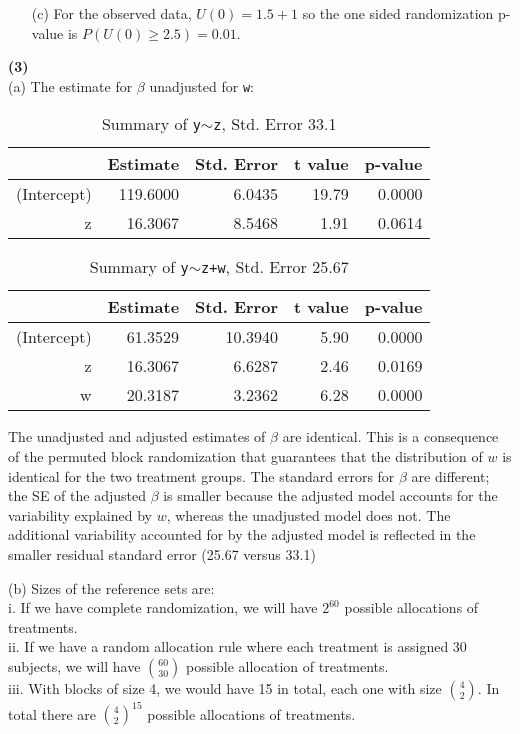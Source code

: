 \documentclass[11pt,a4paper]{article}
\begin{document}
\begin{enumerate}
\item[(c)] For the observed data, $U(0)=1.5+1$ so the one sided randomization p-value is $P(U(0)\geq 2.5)=0.01$.
\end{enumerate}

\noindent
\textbf{(3)} \\
\noindent
(a) The estimate for $\beta$ unadjusted for \texttt{w}:
\begin{table}[H]
\centering
\begin{tabular}{rrrrr}
  \hline
 & Estimate & Std. Error & t value & p-value \\ 
  \hline
(Intercept) & 119.6000 & 6.0435 & 19.79 & 0.0000 \\ 
  z & 16.3067 & 8.5468 & 1.91 & 0.0614 \\ 
   \hline
\end{tabular}
\caption{Summary of \texttt{y}$\sim$\texttt{z}, Std. Error 33.1}
\end{table}

\begin{table}[ht]
\centering
\begin{tabular}{rrrrr}
  \hline
 & Estimate & Std. Error & t value & p-value \\ 
  \hline
(Intercept) & 61.3529 & 10.3940 & 5.90 & 0.0000 \\ 
  z & 16.3067 & 6.6287 & 2.46 & 0.0169 \\ 
  w & 20.3187 & 3.2362 & 6.28 & 0.0000 \\ 
   \hline
\end{tabular}
\caption{Summary of \texttt{y}$\sim$\texttt{z+w}, Std. Error 25.67}
\end{table}

The unadjusted and adjusted estimates of $\beta$ are identical. This is a consequence of the permuted block randomization that guarantees that the distribution of $w$ is identical for the two treatment groups. The standard errors for $\beta$ are different; the SE of the adjusted $\beta$ 
is smaller because the adjusted model accounts for the variability explained by $w$, whereas the unadjusted model does not. The additional variability accounted for by the adjusted model is reflected in the smaller residual standard error (25.67 versus 33.1)

\noindent
(b) Sizes of the reference sets are:\\
i. If we have complete randomization, we will have $2^{60}$ possible allocations of treatments. \\
ii. If we have a random allocation rule where each treatment is assigned 30 subjects, we will have ${60 \choose 30}$ possible allocation of treatments. \\
iii. With blocks of size 4, we would have 15 in total, each one with size ${4 \choose 2}$. In total there are ${4 \choose 2}^{15}$ possible allocations of treatments. \\
\end{document}

